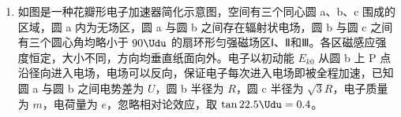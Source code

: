 \documentclass[\gkver]{gaokaozhenti}
\begin{document}
\begin{enumerate}
\begin{enumerate}
	\item
	通过计算，判断乙算珠能否滑动到边框 a；

	\item
	求甲算珠从拨出到停下所需的时间。
\end{enumerate}



\item
如图是一种花瓣形电子加速器简化示意图，空间有三个同心圆 a、b、c 围成的区域，圆 a 内为无场区，圆 a 与圆 b 之间存在辐射状电场，圆 b 与圆 c 之间有三个圆心角均略小于 $90\Udu$ 的扇环形匀强磁场区Ⅰ、Ⅱ和Ⅲ。各区磁感应强度恒定，大小不同，方向均垂直纸面向外。电子以初动能 $E_{k0}$ 从圆 b 上 P 点沿径向进入电场，电场可以反向，保证电子每次进入电场即被全程加速，已知圆 a 与圆 b 之间电势差为 $U$，圆 b 半径为 $R$，圆 c 半径为 $\sqrt{3}R$，电子质量为 $m$，电荷量为 $e$，忽略相对论效应，取 $\tan22.5\Udu=0.4$。


\end{enumerate}
\end{document}
